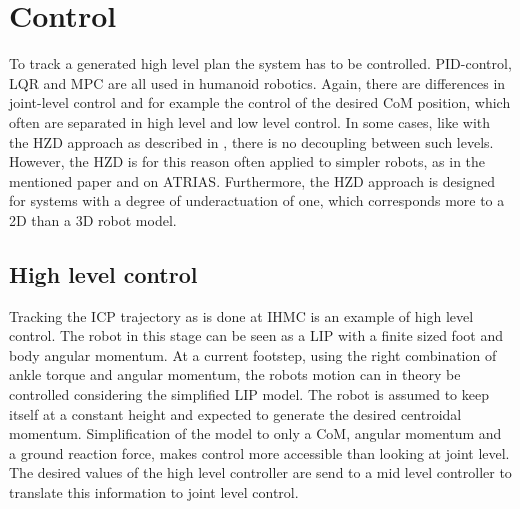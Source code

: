 \section{Control}
To track a generated high level plan the system has to be controlled. PID-control, LQR and MPC are all used in humanoid robotics. Again, there are differences in joint-level control and for example the control of the desired \ac{CoM} position, which often are separated in high level and low level control. In some cases, like with the \ac{HZD} approach as described in \cite{westervelt2003hybrid}, there is no decoupling between such levels. However, the \ac{HZD} is for this reason often applied to simpler robots, as in the mentioned paper and on ATRIAS. Furthermore, the \ac{HZD} approach is designed for systems with a degree of underactuation of one, which corresponds more to a \ac{2D} than a \ac{3D} robot model. 
\subsection{High level control}
Tracking the \ac{ICP} trajectory as is done at IHMC is an example of high level control. The robot in this stage can be seen as a \ac{LIP} with a finite sized foot and body angular momentum. At a current footstep, using the right combination of ankle torque and angular momentum, the robots motion can in theory be controlled considering the simplified \ac{LIP} model. The robot is assumed to keep itself at a constant height and expected to generate the desired centroidal momentum. Simplification of the model to only a \ac{CoM}, angular momentum and a ground reaction force, makes control more accessible than looking at joint level. The desired values of the high level controller are send to a mid level controller to translate this information to joint level control.
